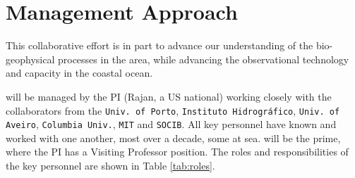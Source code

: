 \section{Management Approach}

This collaborative effort is in part to advance our understanding of
the bio-geophysical processes in the \naz area, while advancing the
observational technology and capacity in the coastal ocean. 

\proj will be managed by the PI (Rajan, a US national) working closely
with the collaborators from the \texttt{Univ. of Porto},
\texttt{Instituto Hidrogr\'{a}fico}, \texttt{Univ. of Aveiro},
\texttt{Columbia Univ.}, \texttt{MIT} and \texttt{SOCIB}.  All key
personnel have known and worked with one another, most over a decade,
some at sea. \univ will be the prime, where the PI has a Visiting
Professor position. The roles and responsibilities of the key
personnel are shown in Table \ref{tab:roles}.


